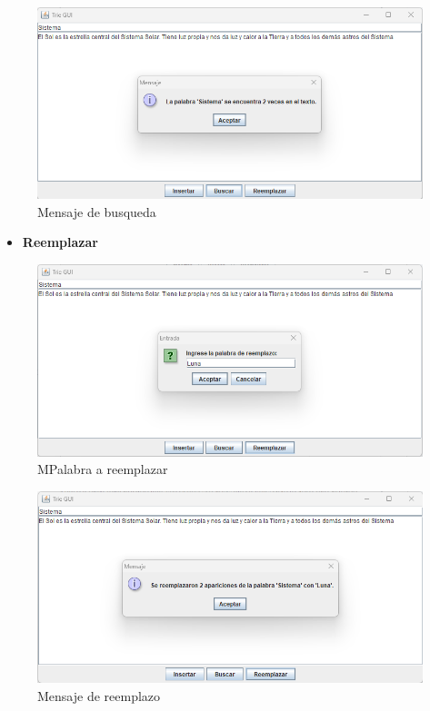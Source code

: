 \documentclass{article}
\begin{document}
 \begin{figure}[H]
       \centering
       \includegraphics[scale=0.79]{img/img18.png}
       \caption{Mensaje de busqueda}
       \label{fig:enter-label}
 \end{figure}
 \clearpage
\begin{itemize}
    \item \textbf{Reemplazar}
\end{itemize}
 \begin{figure}[H]
       \centering
       \includegraphics[scale=0.79]{img/img19.png}
       \caption{MPalabra a reemplazar}
       \label{fig:enter-label}
 \end{figure}
  \begin{figure}[H]
       \centering
       \includegraphics[scale=0.79]{img/img20.png}
       \caption{Mensaje de reemplazo}
       \label{fig:enter-label}
 \end{figure}
\end{document}
